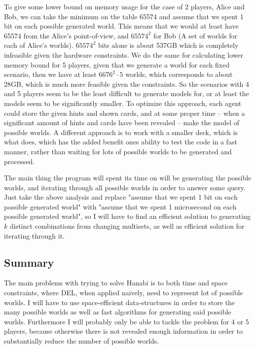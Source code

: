 To give some lower bound on memory usage for the case of 2 players, Alice and Bob, we can take the minimum on the table 65574 and assume that we spent 1 bit on each possible generated world. This means that we would at least have 65574 from the Alice's point-of-view, and $65574^2$ for Bob (A set of worlds for each of Alice's worlds). $65574^2$ bits alone is about 537GB which is completely infeasible given the hardware constraints. 
We do the same for calculating lower memory bound for 5 players, given that we generate a world for each fixed scenario, then we have at least $6676^2 \cdot 5$ worlds, which corresponds to about 28GB, which is much more feasible given the constraints.
So the scenarios with 4 and 5 players seem to be the least difficult to generate models for, or at least the models seem to be significantly smaller.
To optimize this approach, each agent could store the given hints and shown cards, and at some proper time -- when a significant amount of hints and cards have been revealed -- make the model of possible worlds. A different approach is to work with a smaller deck, which is what \cite{EgerAndMartens17} does, which has the added benefit ones ability to test the code in a fast manner, rather than waiting for lots of possible worlds to be generated and processed.

The main thing the program will spent its time on will be generating the possible worlds, and iterating through all possible worlds in order to answer some query. Just take the above analysis and replace "assume that we spent 1 bit on each possible generated world" with "assume that we spent 1 microsecond on each possible generated world", so I will have to find an efficient solution to generating $k$ distinct combinations from changing multisets, as well as efficient solution for iterating through it.

\subsection{Summary}
The main problems with trying to solve Hanabi is to both time and space constraints, where DEL, when applied naively, need to represent lot of possible worlds. 
I will have to use space-efficient data-structures in order to store the many possible worlds as well as fast algorithms for generating said possible worlds. 
Furthermore I will probably only be able to tackle the problem for 4 or 5 players, because otherwise there is not revealed enough information in order to substantially reduce the number of possible worlds.
